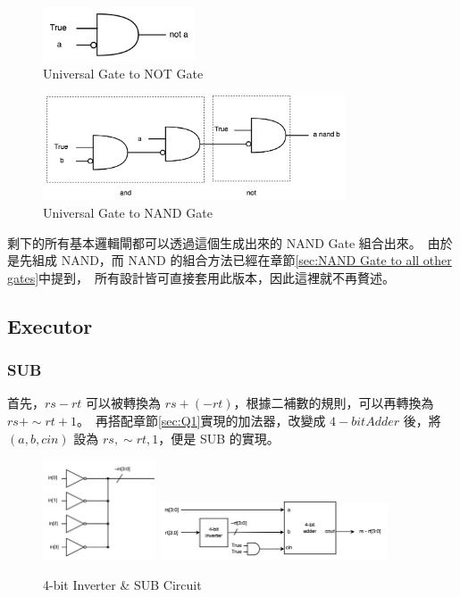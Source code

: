 \documentclass[10.5pt,compsoc,UTF8]{CjC}
\theoremstyle{mystyle}
\begin{document}
\begin{figure}[h]
  \centering
  \includegraphics[width=0.4\textwidth]{Universal_not.png}
  \caption{Universal Gate to NOT Gate}
  \label{fig:Universal Gate}
\end{figure}


\begin{figure}[h]
  \centering
  \includegraphics[width=0.8\textwidth]{Universal_nand.png}
  \caption{Universal Gate to NAND Gate}
  \label{fig:Universal Gate to NAND}
\end{figure}

剩下的所有基本邏輯閘都可以透過這個生成出來的 NAND Gate 組合出來。\
由於是先組成 NAND，而 NAND 的組合方法已經在章節\ref{sec:NAND Gate to all other gates}中提到，\
所有設計皆可直接套用此版本，因此這裡就不再贅述。
\subsection{Executor}
\subsubsection*{SUB}
首先，$rs - rt$ 可以被轉換為 $rs + (-rt)$，根據二補數的規則，可以再轉換為 $rs + \sim rt + 1$。\
再搭配章節\ref{sec:Q1}實現的加法器，改變成 $4-bit Adder$ 後，將 $(a, b, cin)$ 設為 $rs, \sim rt, 1$，便是 SUB 的實現。

\begin{figure}[htp]
  \centering
  \includegraphics[width=0.3\textwidth]{inverter.png}
  \includegraphics[width=0.6\textwidth]{SUB.png}
  \caption{4-bit Inverter \& SUB Circuit}
  \label{fig:SUB}

\end{figure}
\end{document}
